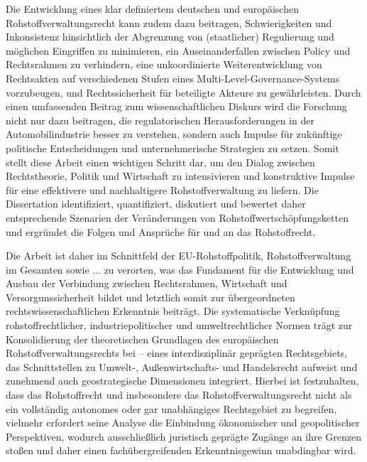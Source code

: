 \documentclass[12pt,a4paper,oneside]{book} %
\begin{document}
Die Entwicklung eines klar definiertem deutschen und europäischen Rohstoffverwaltungsrecht kann zudem dazu beitragen, Schwierigkeiten und Inkonsistenz hinsichtlich der Abgrenzung von (staatlicher) Regulierung und möglichen Eingriffen zu minimieren, ein Auseinanderfallen zwischen Policy und Rechtsrahmen zu verhindern, eine unkoordinierte Weiterentwicklung von Rechtsakten auf verschiedenen Stufen eines Multi-Level-Governance-Systems vorzubeugen, und Rechtssicherheit für beteiligte Akteure zu gewährleisten. Durch einen umfassenden Beitrag zum wissenschaftlichen Diskurs wird die Forschung nicht nur dazu beitragen, die regulatorischen Herausforderungen in der Automobilindustrie besser zu verstehen, sondern auch Impulse für zukünftige politische Entscheidungen und unternehmerische Strategien zu setzen. Somit stellt diese Arbeit einen wichtigen Schritt dar, um den Dialog zwischen Rechtstheorie, Politik und Wirtschaft zu intensivieren und konstruktive Impulse für eine effektivere und nachhaltigere Rohstoffverwaltung zu liefern. Die Dissertation identifiziert, quantifiziert, diskutiert und bewertet daher entsprechende Szenarien der Veränderungen von Rohstoffwertschöpfungsketten und ergründet die Folgen und Ansprüche für und an das Rohstoffrecht.

Die Arbeit ist daher im Schnittfeld der EU-Rohstoffpolitik, Rohstoffverwaltung im Gesamten sowie ... zu verorten, was das Fundament für die Entwicklung und Ausbau der Verbindung zwischen Rechtsrahmen, Wirtschaft und Versorgunssicherheit bildet und letztlich somit zur übergeordneten rechtswissenschaftlichen Erkenntnis beiträgt. Die systematische Verknüpfung rohstoffrechtlicher, industriepolitischer und umweltrechtlicher Normen trägt zur Konsolidierung der theoretischen Grundlagen des europäischen Rohstoffverwaltungsrechts bei – eines interdisziplinär geprägten Rechtsgebiets, das Schnittstellen zu Umwelt-, Außenwirtschafts- und Handelsrecht aufweist und zunehmend auch geostrategische Dimensionen integriert. Hierbei ist festzuhalten, dass das Rohstoffrecht und insbesondere das Rohstoffverwaltungsrecht nicht als ein vollständig autonomes oder gar unabhängiges Rechtsgebiet zu begreifen, vielmehr erfordert seine Analyse die Einbindung ökonomischer und geopolitischer Perspektiven, wodurch ausschließlich juristisch geprägte Zugänge an ihre Grenzen stoßen und daher einen fachübergreifenden Erkenntnisgewinn unabdingbar wird.
\end{document}

